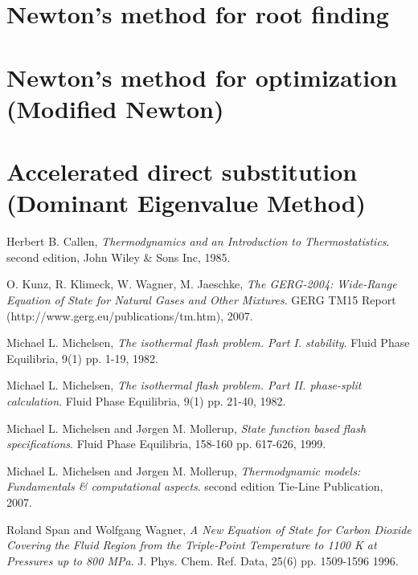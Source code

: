 \documentclass[english]{../thermomemo/thermomemo}
\begin{document}
\appendix

\section{Newton's method for root finding}
\section{Newton's method for optimization (Modified Newton)}
\section{Accelerated direct substitution (Dominant Eigenvalue Method)}


\begin{thebibliography}{9}

  Herbert B. Callen,
  \emph{Thermodynamics and an Introduction to Thermostatistics}.
  second edition,
  John Wiley \& Sons Inc,
  1985.

  O. Kunz, R. Klimeck, W. Wagner, M. Jaeschke,
  \emph{The GERG-2004: Wide-Range Equation of State for Natural Gases and Other Mixtures}.
  GERG TM15 Report (http://www.gerg.eu/publications/tm.htm),
  2007.

  Michael L. Michelsen,
  \emph{The isothermal flash problem. Part I. stability}.
  Fluid Phase Equilibria,
  9(1)
  pp. 1-19,
  1982.

  Michael L. Michelsen,
  \emph{The isothermal flash problem. Part II. phase-split calculation}.
  Fluid Phase Equilibria,
  9(1)
  pp. 21-40,
  1982.

  Michael L. Michelsen and J{\o}rgen M. Mollerup,
  \emph{State function based flash specifications}.
  Fluid Phase Equilibria,
  158-160
  pp. 617-626,
  1999.

  Michael L. Michelsen and J{\o}rgen M. Mollerup,
  \emph{Thermodynamic models: Fundamentals \& computational aspects}.
  second edition
  Tie-Line Publication,
  2007.

  Roland Span and Wolfgang Wagner,
  \emph{A New Equation of State for Carbon Dioxide Covering the Fluid Region
  from the Triple-Point Temperature to 1100 {K} at Pressures up to 800 {MPa}}.
  J. Phys. Chem. Ref. Data,
  25(6)
  pp. 1509-1596
  1996.

\end{thebibliography}
\end{document}

